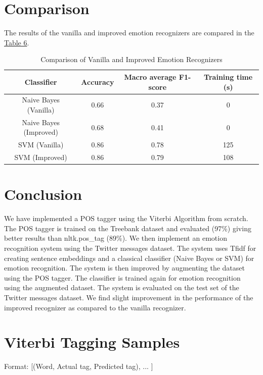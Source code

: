 \documentclass{article}
\begin{document}
\section{Comparison}
The results of the vanilla and improved emotion recognizers are compared in the \hyperref[table:comparison]{Table 6}.
\begin{table}[h]
    \label{table:comparison}
\centering
\begin{tabular}{|c|c|c|c|}
\hline
\textbf{Classifier} & \textbf{Accuracy} & \textbf{Macro average F1-score} & \textbf{Training time (s)} \\ \hline
Naive Bayes (Vanilla) & 0.66 & 0.37 & 0 \\ \hline
Naive Bayes (Improved) & 0.68 & 0.41 & 0 \\ \hline
SVM (Vanilla) & 0.86 & 0.78 & 125 \\ \hline
SVM (Improved) & 0.86 & 0.79 & 108 \\ \hline
\end{tabular}
\bigskip
\caption{Comparison of Vanilla and Improved Emotion Recognizers}
\end{table}

\section{Conclusion}
We have implemented a POS tagger using the Viterbi Algorithm from scratch. The POS tagger is trained on the Treebank dataset and evaluated (97\%) giving better results than nltk.pos\_tag (89\%). We then implement an emotion recognition system using the Twitter messages dataset. The system uses Tfidf for creating sentence embeddings and a classical classifier (Naive Bayes or SVM) for emotion recognition. The system is then improved by augmenting the dataset using the POS tagger. The classifier is trained again for emotion recognition using the augmented dataset. The system is evaluated on the test set of the Twitter messages dataset. We find slight improvement in the performance of the improved recognizer as compared to the vanilla recognizer.


\clearpage

\appendix

\section{Viterbi Tagging Samples}
\label{appendix}
Format: [(Word, Actual tag, Predicted tag), ... ]
\end{document}

